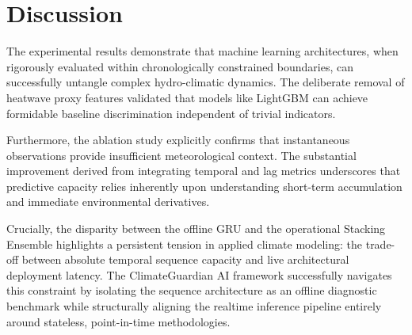\section{Discussion}
\label{sec:discussion}
The experimental results demonstrate that machine learning architectures, when rigorously evaluated within chronologically constrained boundaries, can successfully untangle complex hydro-climatic dynamics. The deliberate removal of heatwave proxy features validated that models like LightGBM can achieve formidable baseline discrimination independent of trivial indicators. 

Furthermore, the ablation study explicitly confirms that instantaneous observations provide insufficient meteorological context. The substantial improvement derived from integrating temporal and lag metrics underscores that predictive capacity relies inherently upon understanding short-term accumulation and immediate environmental derivatives. 

Crucially, the disparity between the offline GRU and the operational Stacking Ensemble highlights a persistent tension in applied climate modeling: the trade-off between absolute temporal sequence capacity and live architectural deployment latency. The ClimateGuardian AI framework successfully navigates this constraint by isolating the sequence architecture as an offline diagnostic benchmark while structurally aligning the realtime inference pipeline entirely around stateless, point-in-time methodologies.
